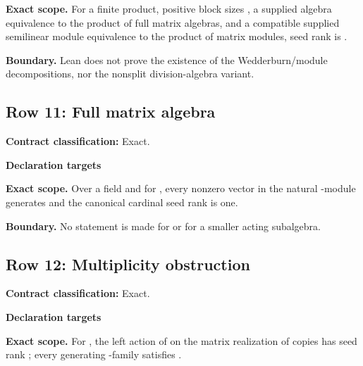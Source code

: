 {\small\noindent{}\par}
{\small\noindent{}\par}
\medskip\noindent\textbf{Exact scope.} For a finite product, positive block sizes , a supplied algebra equivalence to the product of full matrix algebras, and a compatible supplied semilinear module equivalence to the product of  matrix modules, seed rank is .
\par\smallskip\noindent\textbf{Boundary.} Lean does not prove the existence of the Wedderburn/module decompositions, nor the nonsplit division-algebra variant.
\medskip
{}\subsection{Row 11: Full matrix algebra}
\label{row:11}
\textbf{Contract classification:} Exact.
\par\smallskip\textbf{Declaration targets}\par
{\small\noindent{}\par}
{\small\noindent{}\par}
\medskip\noindent\textbf{Exact scope.} Over a field and for , every nonzero vector in the natural -module generates and the canonical cardinal seed rank is one.
\par\smallskip\noindent\textbf{Boundary.} No statement is made for  or for a smaller acting subalgebra.
\medskip
{}\subsection{Row 12: Multiplicity obstruction}
\label{row:12}
\textbf{Contract classification:} Exact.
\par\smallskip\textbf{Declaration targets}\par
{\small\noindent{}\par}
{\small\noindent{}\par}
\medskip\noindent\textbf{Exact scope.} For , the left action of  on the  matrix realization of  copies has seed rank ; every generating -family satisfies .
